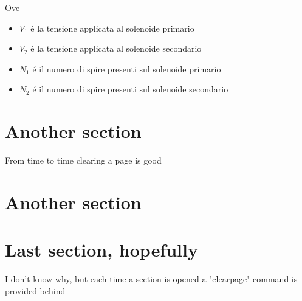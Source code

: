\documentclass[17pt]{extarticle}
\begin{document}
Ove




\begin{itemize}
	\item $V_1$ \'e la tensione applicata al solenoide primario
	\item $V_2$ \'e la tensione applicata al solenoide secondario
	\item $N_1$ \'e il numero di spire presenti sul solenoide primario
	\item $N_2$ \'e il numero di spire presenti sul solenoide secondario
\end{itemize}

	


\section{Another section}\label{par:OndaMeccanica}


From time to time clearing a page is good


\clearpage

\section{Another section}


\clearpage

\section{Last section, hopefully}\label{cap:elettromagnetiche}

I don't know why, but each time a section is opened a "clearpage" command is provided behind
\end{document}
